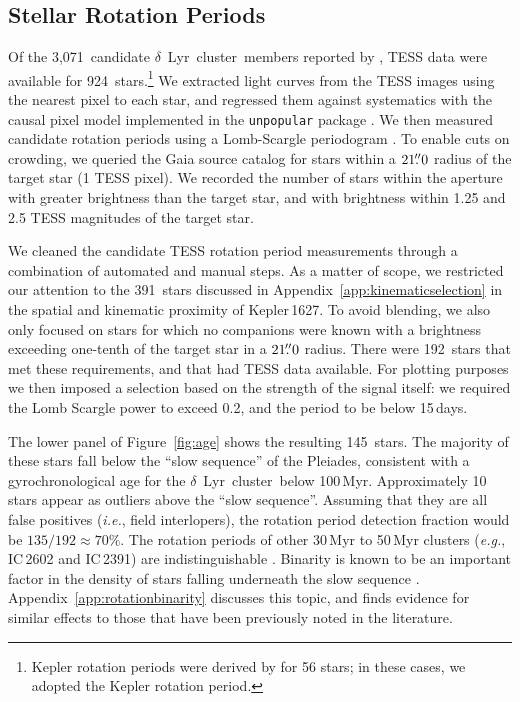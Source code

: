 \documentclass[12pt,modern,twocolumn,tighten]{aastex63}
\newcommand{\cn}{$\delta$\ Lyr\ cluster} %
\newcommand{\noriginal}{3{,}071} %
\newcommand{\nwithtess}{924} %
\newcommand{\nkinwithtess}{391} %
\newcommand{\nkinwithtessandcrowding}{192} %
\newcommand{\nkindefaultcleaning}{145} %
\newcommand{\nrotgood}{135} %
\newcommand{\nfracprot}{70} %
\begin{document}
\subsection{Stellar Rotation Periods}

Of the \noriginal\ candidate \cn\ members reported by
\citet{kounkel_untangling_2019}, TESS data were available for
\nwithtess\ stars.\footnote{Kepler rotation periods were derived by
\citet{mcquillan_rotation_2014} for 56 stars; in these cases, we
adopted the Kepler rotation period.  } We extracted light curves from
the TESS images using the nearest pixel to each star, and regressed
them against systematics with the causal pixel model implemented in
the \texttt{unpopular} package \citep{hattorio_2021_cpm}.  We then
measured candidate rotation periods using a Lomb-Scargle periodogram
\citep{lomb_1976,scargle_studies_1982,astropy_2018}.  To enable cuts
on crowding, we queried the Gaia source catalog for stars within a
$21\mbox{$.\!\!^{\prime\prime}$}0$ radius of the target star (1 TESS pixel).  We recorded the
number of stars within the aperture with greater brightness than the
target star, and with brightness within 1.25 and 2.5 TESS magnitudes
of the target star.  

We cleaned the candidate TESS rotation period measurements through a
combination of automated and manual steps.  As a matter of scope, we
restricted our attention to the \nkinwithtess\ stars discussed in
Appendix~\ref{app:kinematicselection} in the spatial
and kinematic proximity of Kepler\,1627.  To avoid blending, we also only focused on stars
for which no companions were known with a brightness exceeding
one-tenth of the target star in a $21\mbox{$.\!\!^{\prime\prime}$}0$ radius.  There were
\nkinwithtessandcrowding\ stars that met these requirements, and that
had TESS data available.  For plotting purposes we then imposed a
selection based on the strength of the signal itself:
we required the Lomb Scargle power to exceed 0.2, and the period to be
below 15\,days.

The lower panel of Figure~\ref{fig:age} shows the resulting
\nkindefaultcleaning\ stars.  The majority of these stars fall below
the ``slow sequence'' of the Pleiades, consistent with a
gyrochronological age for the \cn\ below 100\,Myr.  Approximately 10
stars appear as outliers above the ``slow sequence''.  Assuming that
they are all false positives ({\it i.e.}, field interlopers), the
rotation period detection fraction would be
$\nrotgood/\nkinwithtessandcrowding \approx \nfracprot\%$.
The rotation periods of other 30\,Myr to 50\,Myr clusters
({\it e.g.}, IC\,2602 and IC\,2391) are indistinguishable
\citep{douglas_stephanie_t_2021_5131306}. 
Binarity is known to be an important factor in the density of stars
falling underneath the slow sequence
\citep{meibom_effect_2007,gillen_ngts_2020,bouma_2021_ngc2516}.
Appendix~\ref{app:rotationbinarity} discusses this topic, and finds
evidence for similar effects to those that have been previously
noted in the literature.
\end{document}

